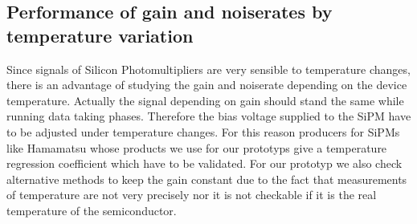 \subsection{Performance of gain and noiserates by temperature variation}
Since signals of Silicon Photomultipliers are very sensible to temperature changes, there is an advantage of studying the gain and noiserate depending on the device temperature. Actually the signal depending on gain should stand the same while running data taking phases. Therefore the bias voltage supplied to the SiPM have to be adjusted under temperature changes. For this reason producers for SiPMs like Hamamatsu whose products we use for our prototyps give a temperature regression coefficient which have to be validated. For our prototyp we also check alternative methods to keep the gain constant due to the fact that measurements of temperature are not very precisely nor it is not checkable if it is the real temperature of the semiconductor.

